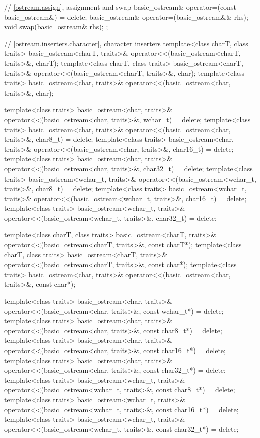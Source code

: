 \begin{codeblock}
{{    // \ref{ostream.assign}, assignment and swap
    basic_ostream& operator=(const basic_ostream&) = delete;
    basic_ostream& operator=(basic_ostream&& rhs);
    void swap(basic_ostream& rhs);
  };

  // \ref{ostream.inserters.character}, character inserters
  template<class charT, class traits>
    basic_ostream<charT, traits>& operator<<(basic_ostream<charT, traits>&, charT);
  template<class charT, class traits>
    basic_ostream<charT, traits>& operator<<(basic_ostream<charT, traits>&, char);
  template<class traits>
    basic_ostream<char, traits>& operator<<(basic_ostream<char, traits>&, char);

  template<class traits>
    basic_ostream<char, traits>& operator<<(basic_ostream<char, traits>&, wchar_t) = delete;
  template<class traits>
    basic_ostream<char, traits>& operator<<(basic_ostream<char, traits>&, char8_t) = delete;
  template<class traits>
    basic_ostream<char, traits>& operator<<(basic_ostream<char, traits>&, char16_t) = delete;
  template<class traits>
    basic_ostream<char, traits>& operator<<(basic_ostream<char, traits>&, char32_t) = delete;
  template<class traits>
    basic_ostream<wchar_t, traits>&
      operator<<(basic_ostream<wchar_t, traits>&, char8_t) = delete;
  template<class traits>
    basic_ostream<wchar_t, traits>&
      operator<<(basic_ostream<wchar_t, traits>&, char16_t) = delete;
  template<class traits>
    basic_ostream<wchar_t, traits>&
      operator<<(basic_ostream<wchar_t, traits>&, char32_t) = delete;

  template<class charT, class traits>
    basic_ostream<charT, traits>& operator<<(basic_ostream<charT, traits>&, const charT*);
  template<class charT, class traits>
    basic_ostream<charT, traits>& operator<<(basic_ostream<charT, traits>&, const char*);
  template<class traits>
    basic_ostream<char, traits>& operator<<(basic_ostream<char, traits>&, const char*);

  template<class traits>
    basic_ostream<char, traits>&
      operator<<(basic_ostream<char, traits>&, const wchar_t*) = delete;
  template<class traits>
    basic_ostream<char, traits>&
      operator<<(basic_ostream<char, traits>&, const char8_t*) = delete;
  template<class traits>
    basic_ostream<char, traits>&
      operator<<(basic_ostream<char, traits>&, const char16_t*) = delete;
  template<class traits>
    basic_ostream<char, traits>&
      operator<<(basic_ostream<char, traits>&, const char32_t*) = delete;
  template<class traits>
    basic_ostream<wchar_t, traits>&
      operator<<(basic_ostream<wchar_t, traits>&, const char8_t*) = delete;
  template<class traits>
    basic_ostream<wchar_t, traits>&
      operator<<(basic_ostream<wchar_t, traits>&, const char16_t*) = delete;
  template<class traits>
    basic_ostream<wchar_t, traits>&
      operator<<(basic_ostream<wchar_t, traits>&, const char32_t*) = delete;
}
\end{codeblock}


